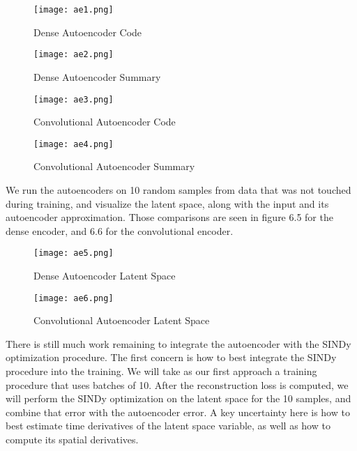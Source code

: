 \documentclass[12pt]{article}
\numberwithin{equation}{section}
\begin{document}
\begin{figure}
\centering
\texttt{[image: ae1.png]}
\caption{Dense Autoencoder Code}
\end{figure}
\begin{figure}
\centering
\texttt{[image: ae2.png]}
\caption{Dense Autoencoder Summary}
\end{figure}
\begin{figure}
\centering
\texttt{[image: ae3.png]}
\caption{Convolutional Autoencoder Code}
\end{figure}
\begin{figure}
\centering
\texttt{[image: ae4.png]}
\caption{Convolutional Autoencoder Summary}
\end{figure}
We run the autoencoders on 10 random samples from data that was not touched during training, and visualize the latent space, along with the input and its autoencoder approximation. Those comparisons are seen in figure 6.5 for the dense encoder, and 6.6 for the convolutional encoder.
\begin{figure}
\centering
\texttt{[image: ae5.png]}
\caption{Dense Autoencoder Latent Space}
\end{figure}
\begin{figure}
\centering
\texttt{[image: ae6.png]}
\caption{Convolutional Autoencoder Latent Space}
\end{figure}
\par There is still much work remaining to integrate the autoencoder with the SINDy optimization procedure. The first concern is how to best integrate the SINDy procedure into the training. We will take as our first approach a training procedure that uses batches of 10. After the reconstruction loss is computed, we will perform the SINDy optimization on the latent space for the 10 samples, and combine that error with the autoencoder error. A key uncertainty here is how to best estimate time derivatives of the latent space variable, as well as how to compute its spatial derivatives.
\end{document}
